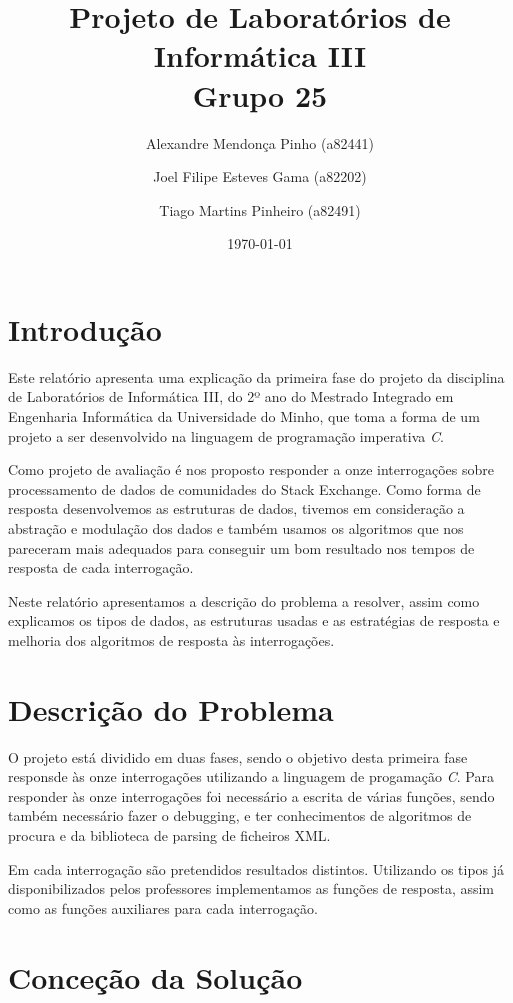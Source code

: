 \documentclass[10pt]{report}
\title{Projeto de Laboratórios de Informática III\\Grupo 25	}
\author{Alexandre Mendonça Pinho (a82441) \and Joel Filipe Esteves Gama (a82202) \and Tiago Martins Pinheiro (a82491)}
\date{\today}
\newcommand\tab[1][0.5cm]{\hspace*{#1}}
\begin{document}
\maketitle

\tableofcontents
\chapter{Introdução}
\label{sec:intro}

\tab Este relatório apresenta uma explicação da primeira fase do projeto da disciplina de Laboratórios de Informática III, do 2º ano do Mestrado Integrado em Engenharia Informática da Universidade do Minho, que toma a forma de um projeto a ser desenvolvido na linguagem de programação imperativa \textit{C}.

Como projeto de avaliação é nos proposto responder a onze interrogações sobre processamento de dados de comunidades do Stack Exchange. Como forma de resposta desenvolvemos as estruturas de dados, tivemos em consideração a abstração e modulação dos dados e também usamos os algoritmos que nos pareceram mais adequados para conseguir um bom resultado nos tempos de resposta de cada interrogação.

Neste relatório apresentamos a descrição do problema a resolver, assim como explicamos os tipos de dados, as estruturas usadas e as estratégias de resposta e melhoria dos algoritmos de resposta às interrogações.
\chapter{Descrição do Problema}
\label{sec:problema}

\tab O projeto está dividido em duas fases, sendo o objetivo desta primeira fase responsde às onze interrogações utilizando a linguagem de progamação \textit{C}. Para responder às onze interrogações foi necessário a escrita de várias funções, sendo também necessário fazer o debugging, e ter conhecimentos de algoritmos de procura e da biblioteca de parsing de ficheiros XML.

Em cada interrogação são pretendidos resultados distintos. Utilizando os tipos já disponibilizados pelos professores implementamos as funções de resposta, assim como as funções auxiliares para cada interrogação.

\chapter{Conceção da Solução}
\end{document}
